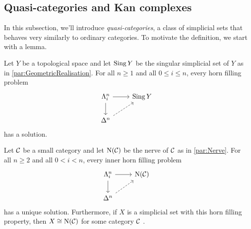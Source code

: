 \subsection{Quasi-categories and Kan complexes}
In this subsection, we'll introduce \emph{quasi-categories}, a class of simplicial sets that behaves very similarly to ordinary categories. To motivate the definition, we start with a lemma.
\begin{lem}\label{lem:LiftingConditions}
	\begin{alphanumerate}
		\item Let $Y$ be a topological space and let $\operatorname{Sing} Y$ be the singular simplicial set of $Y$ as in \cref{par:GeometricRealisation}. For all $n\geqslant 1$ and all $0\leqslant i\leqslant n$, every horn filling problem\label{enum:LiftingSing}
		\begin{equation*}
			\begin{tikzcd}
				\Lambda_i^n\rar\dar & \Sing Y\\
				\Delta^n\urar[dashed]
			\end{tikzcd}
		\end{equation*}
		has a solution.
		\item Let $\mathcal{C}$ be a small category and let $\operatorname{N}(\mathcal{C})$ be the nerve of $\mathcal{C}$ as in \cref{par:Nerve}. For all $n\geqslant 2$ and all $0<i<n$, every inner horn filling problem\label{enum:LiftingN}
		\begin{equation*}
			\begin{tikzcd}
				\Lambda_i^n\rar\dar & \N(\Cc)\\
				\Delta^n\urar[dashed]
			\end{tikzcd}
		\end{equation*}
		has a unique solution. Furthermore, if $X$ is a simplicial set with this horn filling property, then $X\cong \operatorname{N}(\mathcal{C})$ for some category $\mathcal{C}$ .
	\end{alphanumerate}
\end{lem}
